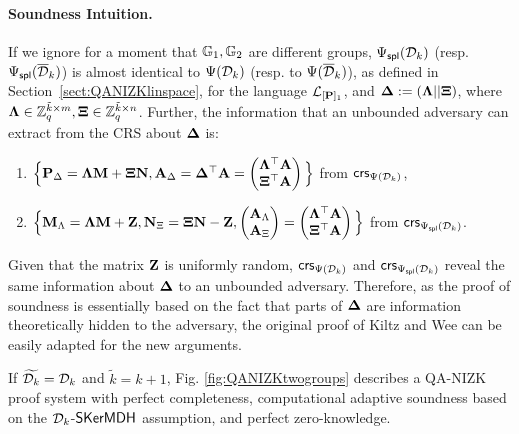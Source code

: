 \paragraph{Soundness Intuition.}   If we ignore for a moment that $\mathbb{G}_1, \mathbb{G}_2$ are different groups, ${\Psi_{\mathsf{spl}}(\mathcal{D}_k)}$ (resp. ${\Psi_\mathsf{spl}(\overline{\mathcal{D}}_k)}$) is almost identical to $\Psi({\mathcal{D}_k})$ (resp. to ${\Psi(\overline{\mathcal{D}}_k)}$), as defined in Section~\ref{sect:QANIZKlinspace}, for the language $\mathcal{L}_{[\mathbf{{P}}]_1}$, and $\mathbf{{\Delta}}:=(\mathbf{{\Lambda}}||\mathbf{{\Xi}})$, where  $\mathbf{{\Lambda}} \in \mathbb{Z}_q^{\tilde{k} \times m},\mathbf{{\Xi}} \in \mathbb{Z}_q^{\tilde{k} \times n}$. Further, the information that an unbounded adversary can extract from the CRS about $\mathbf{{\Delta}}$ is:
 \begin{enumerate}
 \item $\Big\{\mathbf{{P}}_\Delta= \mathbf{{\Lambda}} \mathbf{{M}}+ \mathbf{{\Xi}}\mathbf{{N}}, \mathbf{{A}}_{\Delta} = \mathbf{{\Delta}}^{\top}\mathbf{{A}} =\begin{pmatrix} \mathbf{{\Lambda}}^{\top}\mathbf{{A}} \\ \mathbf{{\Xi}}^{\top}\mathbf{{A}} \end{pmatrix}\Big\}$ from $\mathsf{crs}_{\Psi({\mathcal{D}_k})}$, 
 \item $\Big\{ \mathbf{{M}}_\Lambda = \mathbf{{\Lambda}} \mathbf{{M}}+\mathbf{{Z}}, \mathbf{{N}}_\Xi = \mathbf{{\Xi}}\mathbf{{N}}-\mathbf{{Z}},  \begin{pmatrix}\mathbf{{A}}_\Lambda\\\mathbf{{A}}_\Xi\end{pmatrix} = \begin{pmatrix} \mathbf{{\Lambda}}^{\top}\mathbf{{A}} \\ \mathbf{{\Xi}}^{\top}\mathbf{{A}} \end{pmatrix} \Big\}$ from $\mathsf{crs}_{{\Psi_{\mathsf{spl}}(\mathcal{D}_k)}}$. 
 \end{enumerate}
Given that the matrix $\mathbf{{Z}}$ is uniformly random,  $\mathsf{crs}_{\Psi({\mathcal{D}_k})}$ and $\mathsf{crs}_{{\Psi_{\mathsf{spl}}(\mathcal{D}_k)}}$
reveal the same information about $\mathbf{{\Delta}}$ to an unbounded adversary. Therefore, as the proof of soundness is essentially based on the fact that parts of $\mathbf{{\Delta}}$ are information theoretically hidden to the adversary, the original proof of Kiltz and Wee can be easily adapted for the new arguments. 

\begin{theorem} If $\widetilde{\mathcal{D}_{k}}=\mathcal{D}_k$ and $\tilde{k}=k+1$,  Fig. \ref{fig:QANIZKtwogroups} describes a QA-NIZK
proof system with perfect completeness, computational adaptive soundness based on the  $\mathcal{D}_{k}$-$\mathsf{SKerMDH}$ assumption, and perfect zero-knowledge. 
\label{theo:membtwogroups1}
\end{theorem}

